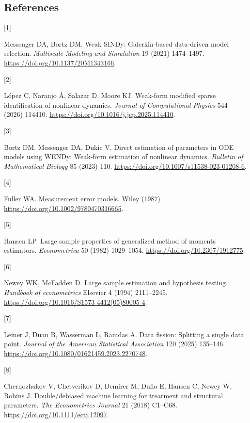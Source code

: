 \documentclass[
  american,
  11pt,
]{article}
\newlength{\cslhangindent}
\newlength{\csllabelwidth}
\newenvironment{CSLReferences}[2] %
 {\begin{list}{}{%
  \setlength{\itemindent}{0pt}
  \setlength{\leftmargin}{0pt}
  \setlength{\parsep}{0pt}
  \ifodd #1
   \setlength{\leftmargin}{\cslhangindent}
   \setlength{\itemindent}{-1\cslhangindent}
  \fi
  \setlength{\itemsep}{#2\baselineskip}}}
 {\end{list}}
\newcommand{\CSLLeftMargin}[1]{\parbox[t]{\csllabelwidth}{\strut#1\strut}}
\newcommand{\CSLRightInline}[1]{\parbox[t]{\linewidth - \csllabelwidth}{\strut#1\strut}}
\begin{document}
\subsection*{References}\label{references}

\protect{}\label{refs}
\begin{CSLReferences}{0}{0}
\CSLLeftMargin{{[}1{]} }%
\CSLRightInline{Messenger DA, Bortz DM. Weak {SINDy}: Galerkin-based
data-driven model selection. \emph{Multiscale Modeling and Simulation}
19 (2021) 1474--1497. \url{https://doi.org/10.1137/20M1343166}.}

\CSLLeftMargin{{[}2{]} }%
\CSLRightInline{López C, Naranjo Á, Salazar D, Moore KJ. Weak-form
modified sparse identification of nonlinear dynamics. \emph{Journal of
Computational Physics} 544 (2026) 114410.
\url{https://doi.org/10.1016/j.jcp.2025.114410}.}

\CSLLeftMargin{{[}3{]} }%
\CSLRightInline{Bortz DM, Messenger DA, Dukic V. Direct estimation of
parameters in {ODE} models using {WENDy}: Weak-form estimation of
nonlinear dynamics. \emph{Bulletin of Mathematical Biology} 85 (2023)
110. \url{https://doi.org/10.1007/s11538-023-01208-6}.}

\CSLLeftMargin{{[}4{]} }%
\CSLRightInline{Fuller WA. Measurement error models. Wiley (1987)
\url{https://doi.org/10.1002/9780470316665}.}

\CSLLeftMargin{{[}5{]} }%
\CSLRightInline{Hansen LP. Large sample properties of generalized method
of moments estimators. \emph{Econometrica} 50 (1982) 1029--1054.
\url{https://doi.org/10.2307/1912775}.}

\CSLLeftMargin{{[}6{]} }%
\CSLRightInline{Newey WK, McFadden D. Large sample estimation and
hypothesis testing. \emph{Handbook of econometrics} Elsevier 4 (1994)
2111--2245. \url{https://doi.org/10.1016/S1573-4412(05)80005-4}.}

\CSLLeftMargin{{[}7{]} }%
\CSLRightInline{Leiner J, Duan B, Wasserman L, Ramdas A. Data fission:
Splitting a single data point. \emph{Journal of the American Statistical
Association} 120 (2025) 135--146.
\url{https://doi.org/10.1080/01621459.2023.2270748}.}

\CSLLeftMargin{{[}8{]} }%
\CSLRightInline{Chernozhukov V, Chetverikov D, Demirer M, Duflo E,
Hansen C, Newey W, Robins J. Double/debiased machine learning for
treatment and structural parameters. \emph{The Econometrics Journal} 21
(2018) C1--C68. \url{https://doi.org/10.1111/ectj.12097}.}


\end{CSLReferences}
\end{document}

